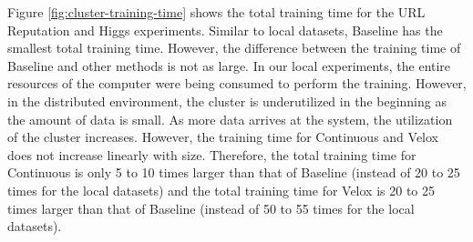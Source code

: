\documentclass[10pt,conference,letterpaper]{IEEEtran}
\begin{document}
Figure \ref{fig:cluster-training-time} shows the total training time for the URL Reputation and Higgs experiments.
Similar to local datasets, Baseline has the smallest total training time.
However, the difference between the training time of Baseline and other methods is not as large.
In our local experiments, the entire resources of the computer were being consumed to perform the training.
However, in the distributed environment, the cluster is underutilized in the beginning as the amount of data is small.
As more data arrives at the system, the utilization of the cluster increases.
However, the training time for Continuous and Velox does not increase linearly with size.
Therefore, the total training time for Continuous is only 5 to 10 times larger than that of Baseline (instead of 20 to 25 times for the local datasets) and the total training time for Velox is 20 to 25 times larger than that of Baseline (instead of 50 to 55 times for the local datasets).
\end{document}
